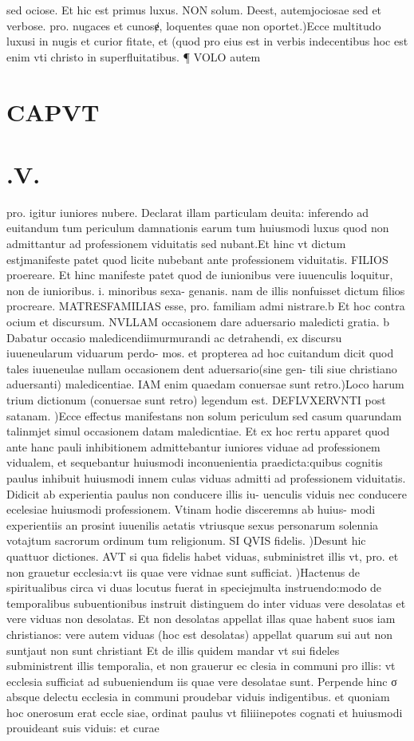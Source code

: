 \documentclass{article}
\begin{document}
\begin{pages}
sed ociose. Et hic est primus luxus. NON solum. Deest, autemjociosae sed et verbose. pro. nugaces et cunosɇ, loquentes quae non oportet.)Ecce multitudo luxusi in nugis et curior fitate, et (quod pro eius est in verbis indecentibus hoc est enim vti christo in superfluitatibus. ¶ VOLO autem  \pend
\section*{CAPVT }
\section*{.V. }
\marginpar{[ p.143 ]}\pstart pro. igitur iuniores nubere. Declarat illam particulam deuita: inferendo ad euitandum tum periculum damnationis earum tum huiusmodi luxus quod non admittantur ad professionem viduitatis sed nubant.Et hinc vt dictum estjmanifeste patet quod licite nubebant ante professionem viduitatis. FILIOS proereare. Et hinc manifeste patet quod de iunionibus vere iuuenculis loquitur, non de iunioribus. i. minoribus sexa- genanis. nam de illis nonfuisset dictum filios procreare. MATRESFAMILIAS esse, pro. familiam admi nistrare.b Et hoc contra ocium et discursum. NVLLAM occasionem dare aduersario maledicti gratia. b Dabatur occasio maledicendiimurmurandi ac detrahendi, ex discursu iuueneularum viduarum perdo- mos. et propterea ad hoc cuitandum dicit quod tales iuueneulae nullam occasionem dent aduersario(sine gen- tili siue christiano aduersanti) maledicentiae. IAM enim quaedam conuersae sunt retro.)Loco harum trium dictionum (conuersae sunt retro) legendum est. DEFLVXERVNTI post satanam. )Ecce effectus manifestans non solum periculum sed casum quarundam talinmjet simul occasionem datam maledicntiae. Et ex hoc rertu apparet quod ante hanc pauli inhibitionem admittebantur iuniores viduae ad professionem vidualem, et sequebantur huiusmodi inconuenientia praedicta:quibus cognitis paulus inhibuit huiusmodi innem culas viduas admitti ad professionem viduitatis. Didicit ab experientia paulus non conducere illis iu- uenculis viduis nec conducere ecelesiae huiusmodi professionem. Vtinam hodie disceremns ab huius- modi experientiis an prosint iuuenilis aetatis vtriusque sexus personarum solennia votajtum sacrorum ordinum tum religionum.  \pend\pstart SI QVIS fidelis. )Desunt hic quattuor dictiones. AVT si qua fidelis habet viduas, subministret illis vt, pro. et non grauetur ecclesia:vt iis quae vere vidnae sunt sufficiat. )Hactenus de spiritualibus circa vi duas locutus fuerat in speciejmulta instruendo:modo de temporalibus subuentionibus instruit distinguem do inter viduas vere desolatas et vere viduas non desolatas. Et non desolatas appellat illas quae habent suos iam christianos: vere autem viduas (hoc est desolatas) appellat quarum sui aut non suntjaut non sunt christiant Et de illis quidem mandar vt sui fideles subministrent illis temporalia, et non grauerur ec clesia in communi pro illis: vt ecclesia sufficiat ad subueniendum iis quae vere desolatae sunt. Perpende hinc σ absque delectu ecclesia in communi proudebar viduis indigentibus. et quoniam hoc onerosum erat eccle siae, ordinat paulus vt filiiinepotes cognati et huiusmodi prouideant suis viduis: et curae 
\end{pages}
\end{document}
